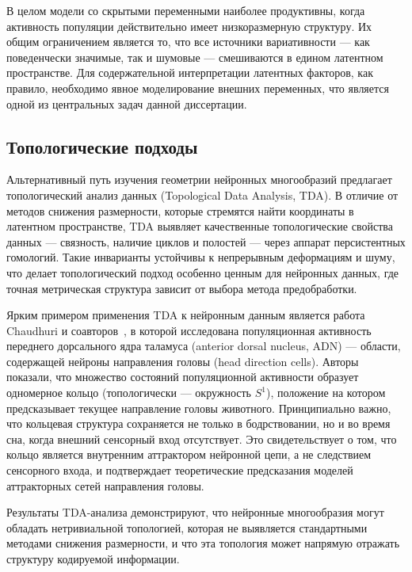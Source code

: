 В целом модели со скрытыми переменными наиболее продуктивны, когда активность популяции действительно имеет низкоразмерную структуру. Их общим ограничением является то, что все источники вариативности --- как поведенчески значимые, так и шумовые --- смешиваются в едином латентном пространстве. Для содержательной интерпретации латентных факторов, как правило, необходимо явное моделирование внешних переменных, что является одной из центральных задач данной диссертации.


\subsection{Топологические подходы}\label{sec:lit_topo}

Альтернативный путь изучения геометрии нейронных многообразий предлагает топологический анализ данных (Topological Data Analysis, TDA). В отличие от методов снижения размерности, которые стремятся найти координаты в латентном пространстве, TDA выявляет качественные топологические свойства данных --- связность, наличие циклов и полостей --- через аппарат персистентных гомологий. Такие инварианты устойчивы к непрерывным деформациям и шуму, что делает топологический подход особенно ценным для нейронных данных, где точная метрическая структура зависит от выбора метода предобработки.

Ярким примером применения TDA к нейронным данным является работа Chaudhuri и соавторов~\cite{Chaudhuri2019}, в которой исследована популяционная активность переднего дорсального ядра таламуса (anterior dorsal nucleus, ADN) --- области, содержащей нейроны направления головы (head direction cells). Авторы показали, что множество состояний популяционной активности образует одномерное кольцо (топологически --- окружность $S^1$), положение на котором предсказывает текущее направление головы животного. Принципиально важно, что кольцевая структура сохраняется не только в бодрствовании, но и во время сна, когда внешний сенсорный вход отсутствует. Это свидетельствует о том, что кольцо является внутренним аттрактором нейронной цепи, а не следствием сенсорного входа, и подтверждает теоретические предсказания моделей аттракторных сетей направления головы.

Результаты TDA-анализа демонстрируют, что нейронные многообразия могут обладать нетривиальной топологией, которая не выявляется стандартными методами снижения размерности, и что эта топология может напрямую отражать структуру кодируемой информации.
